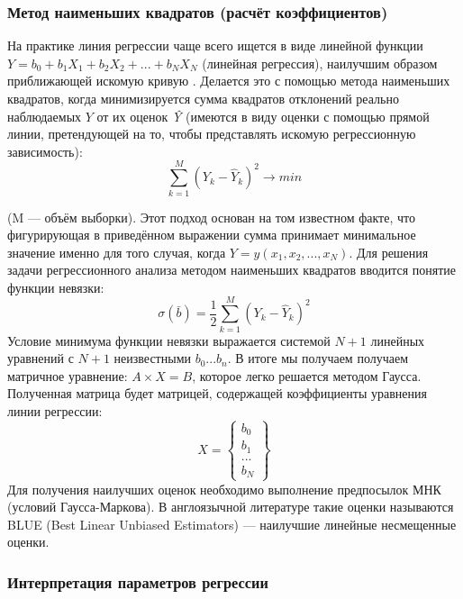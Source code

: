 \subsubsection{Метод наименьших квадратов (расчёт коэффициентов)}

На практике линия регрессии чаще всего ищется в виде линейной функции $Y = b_0 + b_1 X_1 + b_2 X_2 + ... + b_N X_N$ (линейная регрессия), наилучшим образом приближающей искомую кривую \cite{regrmeth}. Делается это с помощью метода наименьших квадратов, когда минимизируется сумма квадратов отклонений реально наблюдаемых $Y$ от их оценок \textit{\^Y} (имеются в виду оценки с помощью прямой линии, претендующей на то, чтобы представлять искомую регрессионную зависимость):
\begin{equation}
\sum\limits_{k=1}^{M}{(Y_k - \hat{Y}_k)^2} \rightarrow min
\end{equation}

(M — объём выборки). Этот подход основан на том известном факте, что фигурирующая в приведённом выражении сумма принимает минимальное значение именно для того случая, когда $Y = y(x_1,x_2,...,x_N)$.
Для решения задачи регрессионного анализа методом наименьших квадратов вводится понятие функции невязки:
\begin{equation}
\sigma(\bar{b}) = \frac{1}{2} \sum\limits_{k=1}^{M}{(Y_k - \hat{Y}_k)^2}
\end{equation}
Условие минимума функции невязки выражается системой $N+1$  линейных уравнений с $N+1$ неизвестными $b_0...b_n$.
В итоге мы получаем получаем матричное уравнение: $A \times X = B$, которое легко решается методом Гаусса. Полученная матрица будет матрицей, содержащей коэффициенты уравнения линии регрессии:
\begin{equation}
X = \left\{ \begin{array}{c}
b_0\\
b_1\\
...\\
b_N
\end{array} \right\}
\end{equation}
Для получения наилучших оценок необходимо выполнение предпосылок МНК (условий Гаусса-Маркова). В англоязычной литературе такие оценки называются BLUE (Best Linear Unbiased Estimators) --- наилучшие линейные несмещенные оценки.

\subsubsection{Интерпретация параметров регрессии}


